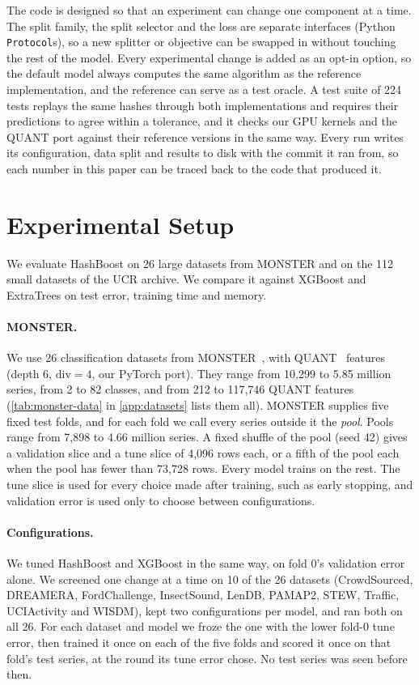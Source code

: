 \documentclass[a4paper, 11pt]{article}
\newcommand{\code}[1]{\texttt{#1}}
\begin{document}
The code is designed so that an experiment can change one component at a
time. The split family, the split selector and the loss are separate
interfaces (Python \code{Protocol}s), so a new splitter or objective can be
swapped in without touching the rest of the model. Every experimental change
is added as an opt-in option, so the default model always computes the same
algorithm as the reference implementation, and the reference can serve as a
test oracle. A test suite of 224 tests replays the same hashes through both
implementations and requires their predictions to agree within a tolerance,
and it checks our GPU kernels and the QUANT port against their reference
versions in the same way. Every run writes its configuration, data split and
results to disk with the commit it ran from, so each number in this paper
can be traced back to the code that produced it.

\section{Experimental Setup}
\label{sec:setup}

We evaluate HashBoost on 26 large datasets from MONSTER and on the 112 small
datasets of the UCR archive. We compare it against XGBoost and ExtraTrees on
test error, training time and memory.

\paragraph{MONSTER.}
We use 26 classification datasets from
MONSTER~\cite{dempster2025monstermonashscalabletime}, with
QUANT~\cite{dempster2024quant} features (depth 6, $\mathrm{div}=4$, our
PyTorch port). They range from 10,299 to 5.85 million series, from 2 to 82
classes, and from 212 to 117,746 QUANT features
(\cref{tab:monster-data} in \cref{app:datasets} lists them all). MONSTER
supplies five fixed test folds, and for each fold we call every series
outside it the \emph{pool}. Pools range from 7,898 to 4.66 million series. A
fixed shuffle of the pool (seed 42) gives a validation slice and a tune slice
of 4,096 rows each, or a fifth of the pool each when the pool has fewer than
73,728 rows. Every model trains on the rest. The tune slice is used for every
choice made after training, such as early stopping, and validation error is
used only to choose between configurations.

\paragraph{Configurations.}
We tuned HashBoost and XGBoost in the same way, on fold 0's validation error
alone. We screened one change at a time on 10 of the 26 datasets
(CrowdSourced, DREAMERA, FordChallenge, InsectSound, LenDB, PAMAP2, STEW,
Traffic, UCIActivity and WISDM), kept two configurations per model, and ran
both on all 26. For each dataset and model we froze the one with the lower
fold-0 tune error, then trained it once on each of the five folds and scored
it once on that fold's test series, at the round its tune error chose. No
test series was seen before then.
\end{document}
